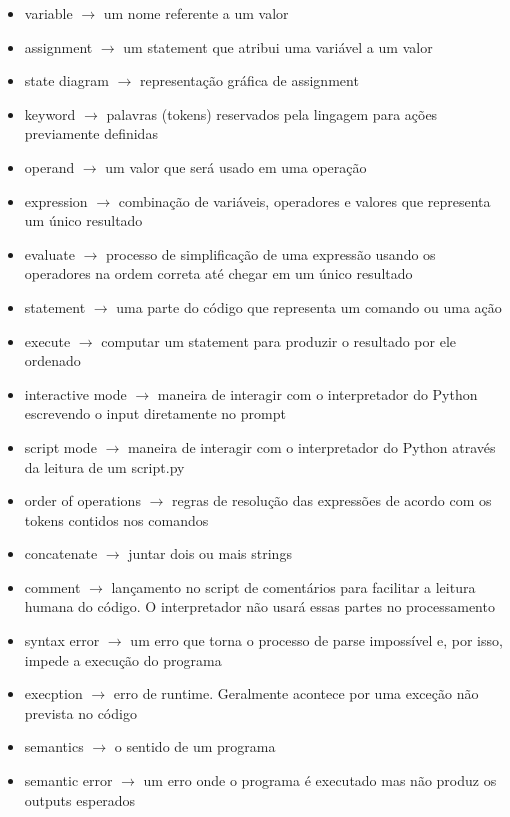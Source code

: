 \documentclass[a4paper,11pt]{book}
\begin{document}
\begin{itemize}
	\item variable $ \rightarrow $ um nome referente a um valor
	\item assignment $ \rightarrow $ um statement que atribui uma variável a um valor
	\item state diagram $ \rightarrow $ representação gráfica de assignment
	\item keyword $ \rightarrow $ palavras (tokens) reservados pela lingagem para ações previamente definidas
	\item operand $ \rightarrow $ um valor que será usado em uma operação
	\item expression $ \rightarrow $ combinação de variáveis, operadores e valores que representa um único resultado
	\item evaluate $ \rightarrow $ processo de simplificação de uma expressão usando os operadores na ordem correta até chegar em um único resultado
	\item statement $ \rightarrow $ uma parte do código que representa um comando ou uma ação
	\item execute $ \rightarrow $ computar um statement para produzir o resultado por ele ordenado
	\item interactive mode $ \rightarrow $ maneira de interagir com o interpretador do Python escrevendo o input diretamente no prompt
	\item script mode $ \rightarrow $ maneira de interagir com o interpretador do Python através da leitura de um script.py
	\item order of operations $ \rightarrow $ regras de resolução das expressões de acordo com os tokens contidos nos comandos
	\item concatenate $ \rightarrow $ juntar dois ou mais strings
	\item comment $ \rightarrow $ lançamento no script de comentários para facilitar a leitura humana do código. O interpretador não usará essas partes no processamento
	\item syntax error $ \rightarrow $ um erro que torna o processo de parse impossível e, por isso, impede a execução do programa
	\item execption $ \rightarrow $ erro de runtime. Geralmente acontece por uma exceção não prevista no código
	\item semantics $ \rightarrow $ o sentido de um programa
	\item semantic error $ \rightarrow $ um erro onde o programa é executado mas não produz os outputs esperados
\end{itemize}
\end{document}
